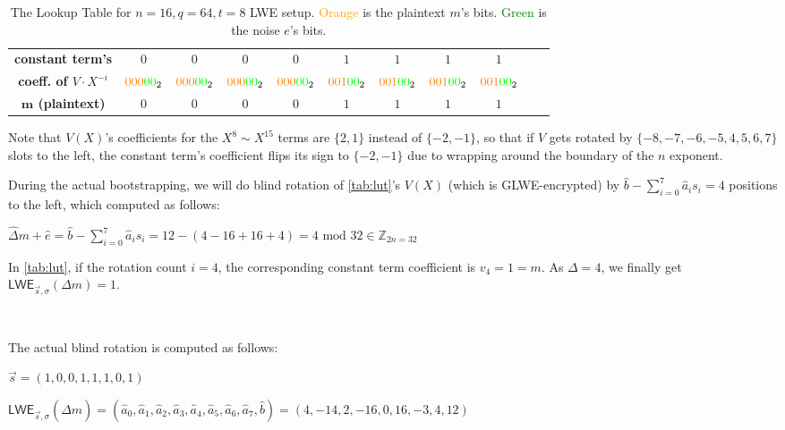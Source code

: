 \begin{enumerate}
\begin{table}[h]
{\begin{tabular}{|c||c|c|c|c|c|c|c|c|c|c|}
\hline
\textbf{constant term's} & $0$ & $0$ & $0$ & $0$ & $1$ & $1$ & $1$ & $1$ \\
\textbf{coeff. of $V\cdot X^{-i}$}& $\textcolor{orange}{000}\textcolor{green}{00}_2$ & $\textcolor{orange}{000}\textcolor{green}{00}_2$ & $\textcolor{orange}{000}\textcolor{green}{00}_2$ & $\textcolor{orange}{000}\textcolor{green}{00}_2$ & $\textcolor{orange}{001}\textcolor{green}{00}_2$ & $\textcolor{orange}{001}\textcolor{green}{00}_2$ & $\textcolor{orange}{001}\textcolor{green}{00}_2$ & $\textcolor{orange}{001}\textcolor{green}{00}_2$ \\
\hline
\textbf{$\bm{m}$ (plaintext)} & $0$ & $0$ & $0$ & $0$ & $1$ & $1$ & $1$ & $1$ \\
\hline
\end{tabular}}
\centering
\caption{The Lookup Table for $n=16, q=64, t=8$ LWE setup.
\textcolor{orange}{Orange} is the plaintext $m$'s bits. \textcolor{green}{Green} is the noise $e$'s bits. %
}
\label{tab:lut}
\end{table}

Note that $V(X)$'s coefficients for the $X^8 \sim X^{15}$ terms are $\{2, 1\}$ instead of $\{-2, -1\}$, so that if $V$ gets rotated by $\{-8,-7,-6,-5,4,5,6,7\}$ slots to the left, the constant term's coefficient flips its sign to $\{-2, -1\}$ due to wrapping around the boundary of the $n$ exponent. 

During the actual bootstrapping, we will do blind rotation of \autoref{tab:lut}'s $V(X)$ (which is GLWE-encrypted) by $\hat{b} - \sum\limits_{i=0}^{7}\hat{a}_is_i = 4$ positions to the left, which computed as follows:

$\hat\Delta m + \hat e = \hat{b} - \sum\limits_{i=0}^{7}\hat{a}_is_i = 12 - (4 - 16 + 16 + 4) = 4 \text{ mod 32} \in \mathbb{Z}_{2n=32}$ 


In \autoref{tab:lut}, if the rotation count $i = 4$, the corresponding constant term coefficient is $v_4 = 1 = m$. As $\Delta = 4$, we finally get $\textsf{LWE}_{\vec{s},\sigma}(\Delta m) = 1$. 



$ $

The actual blind rotation is computed as follows:

$\vec{s} = (1, 0, 0, 1, 1, 1, 0, 1)$

$\textsf{LWE}_{\vec{s}, \sigma}(\hat{\Delta}m) = (\hat{a}_0, \hat{a}_1, \hat{a}_2, \hat{a}_3, \hat{a}_4, \hat{a}_5, \hat{a}_6, \hat{a}_7, \hat{b}) =  (4, -14, 2, -16, 0, 16, -3, 4, 12)$


\end{enumerate}
